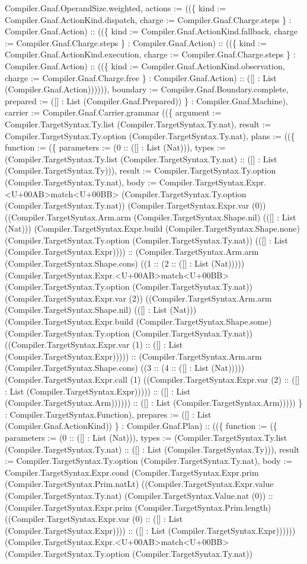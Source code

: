 \documentclass[11pt]{article}
\begin{document}
Compiler.Gnaf.OperandSize.weighted, actions := ((\{ kind := Compiler.Gnaf.ActionKind.dispatch, charge := Compiler.Gnaf.Charge.steps \} : Compiler.Gnaf.Action) :: ((\{ kind := Compiler.Gnaf.ActionKind.fallback, charge := Compiler.Gnaf.Charge.steps \} : Compiler.Gnaf.Action) :: ((\{ kind := Compiler.Gnaf.ActionKind.execution, charge := Compiler.Gnaf.Charge.steps \} : Compiler.Gnaf.Action) :: ((\{ kind := Compiler.Gnaf.ActionKind.observation, charge := Compiler.Gnaf.Charge.free \} : Compiler.Gnaf.Action) :: ([] : List (Compiler.Gnaf.Action)))))), boundary := Compiler.Gnaf.Boundary.complete, prepared := ([] : List (Compiler.Gnaf.Prepared)) \} : Compiler.Gnaf.Machine), carrier := Compiler.Gnaf.Carrier.grammar ((\{ argument := Compiler.TargetSyntax.Ty.list (Compiler.TargetSyntax.Ty.nat), result := Compiler.TargetSyntax.Ty.option (Compiler.TargetSyntax.Ty.nat), plans := ((\{ function := (\{ parameters := (0 :: ([] : List (Nat))), types := (Compiler.TargetSyntax.Ty.list (Compiler.TargetSyntax.Ty.nat) :: ([] : List (Compiler.TargetSyntax.Ty))), result := Compiler.TargetSyntax.Ty.option (Compiler.TargetSyntax.Ty.nat), body := Compiler.TargetSyntax.Expr.<U+00AB>match<U+00BB> (Compiler.TargetSyntax.Ty.option (Compiler.TargetSyntax.Ty.nat)) (Compiler.TargetSyntax.Expr.var (0)) ((Compiler.TargetSyntax.Arm.arm (Compiler.TargetSyntax.Shape.nil) (([] : List (Nat))) (Compiler.TargetSyntax.Expr.build (Compiler.TargetSyntax.Shape.none) (Compiler.TargetSyntax.Ty.option (Compiler.TargetSyntax.Ty.nat)) (([] : List (Compiler.TargetSyntax.Expr)))) :: (Compiler.TargetSyntax.Arm.arm (Compiler.TargetSyntax.Shape.cons) ((1 :: (2 :: ([] : List (Nat))))) (Compiler.TargetSyntax.Expr.<U+00AB>match<U+00BB> (Compiler.TargetSyntax.Ty.option (Compiler.TargetSyntax.Ty.nat)) (Compiler.TargetSyntax.Expr.var (2)) ((Compiler.TargetSyntax.Arm.arm (Compiler.TargetSyntax.Shape.nil) (([] : List (Nat))) (Compiler.TargetSyntax.Expr.build (Compiler.TargetSyntax.Shape.some) (Compiler.TargetSyntax.Ty.option (Compiler.TargetSyntax.Ty.nat)) ((Compiler.TargetSyntax.Expr.var (1) :: ([] : List (Compiler.TargetSyntax.Expr))))) :: (Compiler.TargetSyntax.Arm.arm (Compiler.TargetSyntax.Shape.cons) ((3 :: (4 :: ([] : List (Nat))))) (Compiler.TargetSyntax.Expr.call (1) ((Compiler.TargetSyntax.Expr.var (2) :: ([] : List (Compiler.TargetSyntax.Expr))))) :: ([] : List (Compiler.TargetSyntax.Arm)))))) :: ([] : List (Compiler.TargetSyntax.Arm))))) \} : Compiler.TargetSyntax.Function), prepares := ([] : List (Compiler.Gnaf.ActionKind)) \} : Compiler.Gnaf.Plan) :: ((\{ function := (\{ parameters := (0 :: ([] : List (Nat))), types := (Compiler.TargetSyntax.Ty.list (Compiler.TargetSyntax.Ty.nat) :: ([] : List (Compiler.TargetSyntax.Ty))), result := Compiler.TargetSyntax.Ty.option (Compiler.TargetSyntax.Ty.nat), body := Compiler.TargetSyntax.Expr.cond (Compiler.TargetSyntax.Expr.prim (Compiler.TargetSyntax.Prim.natLt) ((Compiler.TargetSyntax.Expr.value (Compiler.TargetSyntax.Ty.nat) (Compiler.TargetSyntax.Value.nat (0)) :: (Compiler.TargetSyntax.Expr.prim (Compiler.TargetSyntax.Prim.length) ((Compiler.TargetSyntax.Expr.var (0) :: ([] : List (Compiler.TargetSyntax.Expr)))) :: ([] : List (Compiler.TargetSyntax.Expr)))))) (Compiler.TargetSyntax.Expr.<U+00AB>match<U+00BB> (Compiler.TargetSyntax.Ty.option (Compiler.TargetSyntax.Ty.nat)) 
\end{document}
